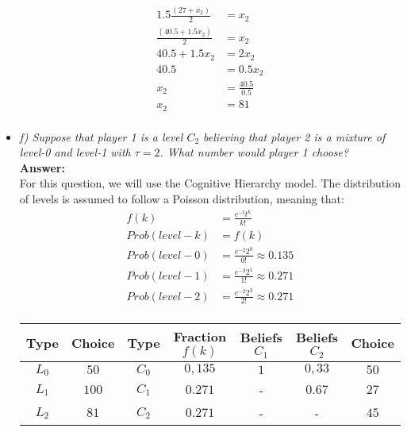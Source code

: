 \documentclass{report}
\begin{document}
\begin{itemize}
\begin{align*} 
 1.5 \frac{(27 + x_2)}{2} &=x_2\\
  \frac{(40.5 + 1.5x_2)}{2} &= x_2\\
 40.5 + 1.5x_2 &= 2x_2\\
40.5 &= 0.5x_2\\
x_2 &= \frac{40.5}{0.5}\\
x_2&=81 \\
\end{align*}
    \item[]\textit{f) Suppose that player 1 is a level $C_2$ believing that player 2 is a mixture of level-0 and level-1 with $ \tau = 2$. What number would player 1 choose?}\\

\textbf{Answer:}\\

For this question, we will use the Cognitive Hierarchy model. The distribution of levels is assumed to follow a Poisson distribution, meaning that:\\

\begin{align*} 
f(k) &= \frac{e^{-t} t^k}{k!}\\
 Prob (level-k) &=f(k)\\
Prob (level-0) &= \frac{e^{-2}2^0}{0!}\approx0.135\\
Prob(level-1)&= \frac{e^{-2}2^1}{1!}\approx0.271\\
Prob(level-2)&= \frac{e^{-2}2^2}{2!}\approx0.271\\
\end{align*}

\begin{table}[H]
\centering

\begin{tabular}{|c|c|c|c|c|c|c|}
\hline
\textbf{Type} & \textbf{Choice} & \textbf{Type} & \textbf{Fraction $f(k)$} & \textbf{Beliefs $C_1$} & \textbf{Beliefs $C_2$} & \textbf{Choice} \\ \hline
$L_0$         & $50$            & $C_0$         & $0,135$                  & $1$                    & $0,33$                 & $50$            \\ \hline
$L_1$         & $100$           & $C_1$         & $0.271$                  & -                      & $0.67$                 & $27$            \\ \hline
$L_2$         & $81$            & $C_2$         & $0.271$                  & -                      & -                      & $45$            \\ \hline


\end{tabular}
\end{table}
\end{itemize}
\end{document}

